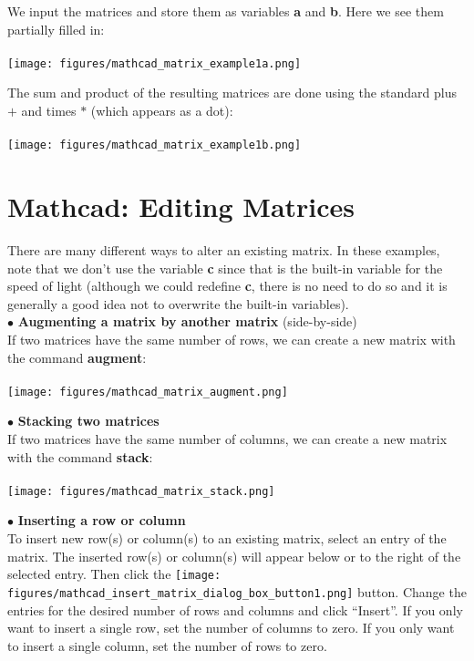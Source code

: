 We input the matrices and store them as variables \textbf{a} and \textbf{b}.  Here we see them partially filled in:\\
\\
\texttt{[image: figures/mathcad\_matrix\_example1a.png]}


The sum and product of the resulting matrices are done using the standard plus $+$ and times $\ast$ (which appears as a dot): \\
\\
\texttt{[image: figures/mathcad\_matrix\_example1b.png]}

\section{Mathcad: Editing Matrices}\label{sec:Mathcad_matrices2}

There are many different ways to alter an existing matrix.  In these examples, note that we don't use the variable \textbf{c} since that is the built-in variable for the speed of light (although we could redefine \textbf{c}, there is no need to do so and it is generally a good idea not to overwrite the built-in variables).\\

$\bullet$ \textbf{Augmenting a matrix by another matrix}  (side-by-side)\\

If two matrices have the same number of rows, we can create a new matrix with the command \textbf{augment}:\\
\\
\texttt{[image: figures/mathcad\_matrix\_augment.png]}

\newpage
$\bullet$ \textbf{Stacking two matrices}\\

If two matrices have the same number of columns, we can create a new matrix with the command \textbf{stack}:\\
\\
\texttt{[image: figures/mathcad\_matrix\_stack.png]}

$\bullet$ \textbf{Inserting a row or column}\\

To insert new row(s) or column(s) to an existing matrix, select an entry of the matrix.  The inserted row(s) or column(s) will appear below or to the right of the selected entry.  Then click the \texttt{[image: figures/mathcad\_insert\_matrix\_dialog\_box\_button1.png]} button.  Change the entries for the desired number of rows and columns and click ``Insert''.  If you only want to insert a single row, set the number of columns to zero.  If you only want to insert a single column, set the number of rows to zero.

